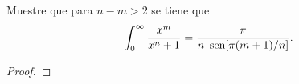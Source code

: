 \begin{Ejc}
   Muestre que para $n-m>2$ se tiene que $$\int_{0}^{\infty}\frac{x^m}{x^n+1}=\frac{\pi}{n \phantom{o}\normalfont{\text{sen}}[\pi(m+1)/n]}.$$
\end{Ejc}
\begin{proof}
   
\end{proof}
